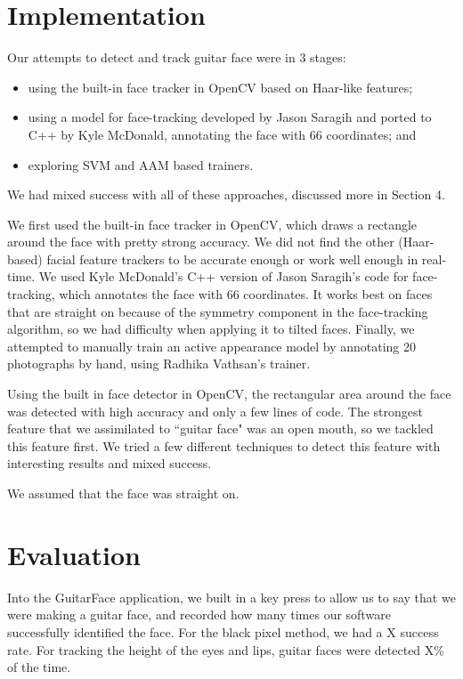 \documentclass[twocolumn]{article}
\begin{document}
\section{Implementation}
Our attempts to detect and track guitar face were in 3 stages:
\begin{itemize}
\item using the built-in face tracker in OpenCV based on Haar-like features;
\item using a model for face-tracking developed by Jason Saragih and ported to C++ by Kyle McDonald, annotating the face with 66 coordinates; and
\item exploring SVM and AAM based trainers.
\end{itemize}
We had mixed success with all of these approaches, discussed more in Section 4. 

We first used the built-in face tracker in OpenCV, which draws a rectangle around the face with pretty strong accuracy. We did not find the other (Haar-based) facial feature trackers to be accurate enough or work well enough in real-time. We used Kyle McDonald's C++ version of Jason Saragih's code for face-tracking, which annotates the face with 66 coordinates. It works best on faces that are straight on because of the symmetry component in the face-tracking algorithm, so we had difficulty when applying it to tilted faces. Finally, we attempted to manually train an active appearance model by annotating 20 photographs by hand, using Radhika Vathsan's trainer. 



Using the built in face detector in OpenCV, the rectangular area around the face was detected with high accuracy and only a few lines of code. The strongest feature that we assimilated to ``guitar face" was an open mouth, so we tackled this feature first. We tried a few different techniques to detect this feature with interesting results and mixed success.

 We assumed that the face was straight on. 

\section{Evaluation}\label{sec:eval}
Into the GuitarFace application, we built in a key press to allow us to say that we were making a guitar face, and recorded how many times our software successfully identified the face. For the black pixel method, we had a X success rate. For tracking the height of the eyes and lips, guitar faces were detected X\% of the time. 
\end{document}
